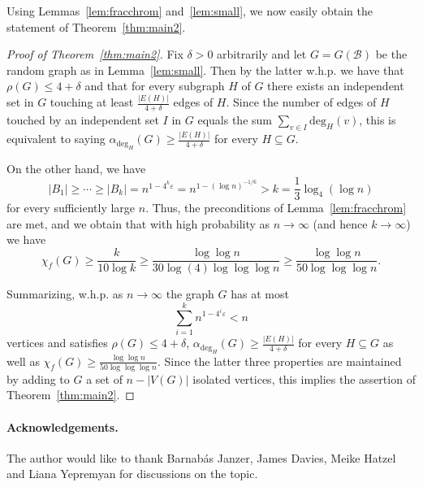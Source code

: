 \documentclass[a4paper,10pt]{amsart}
\begin{document}
Using Lemmas~\ref{lem:fracchrom} and~\ref{lem:small}, we now easily obtain the statement of Theorem~\ref{thm:main2}.

\begin{proof}[Proof of Theorem~\ref{thm:main2}]
Fix $\delta>0$ arbitrarily and let $G=G(\mathcal{B})$ be the random graph as in Lemma~\ref{lem:small}. Then by the latter w.h.p. we have that $\rho(G)\le 4+\delta$ and that for every subgraph $H$ of $G$ there exists an independent set in  $G$ touching at least $\frac{|E(H)|}{4+\delta}$ edges of $H$. Since the number of edges of $H$ touched by an independent set $I$ in $G$ equals the sum $\sum_{v\in I}\mathrm{deg}_H(v)$, this is equivalent to saying $\alpha_{\text{deg}_H}(G)\ge \frac{|E(H)|}{4+\delta}$ for every $H\subseteq G$. 

On the other hand, we have 
$$|B_1|\ge \cdots \ge |B_k|=n^{1-4^k\varepsilon}=n^{1-(\log n)^{-1/6}}>k=\frac{1}{3}\log_4(\log n)$$ for every sufficiently large $n$. Thus, the preconditions of Lemma~\ref{lem:fracchrom} are met, and we obtain that with high probability as $n\rightarrow\infty$ (and hence $k\rightarrow \infty$) we have $$\chi_f(G)\ge \frac{k}{10\log k}\ge \frac{\log \log n}{30\log(4) \log \log \log n}\ge \frac{\log \log n}{50\log \log\log n}.$$

Summarizing, w.h.p. as $n\rightarrow \infty$ the graph $G$ has at most
$$\sum_{i=1}^{k}n^{1-4^i\varepsilon}<n$$ vertices and satisfies $\rho(G)\le 4+\delta$, $\alpha_{\text{deg}_H}(G)\ge \frac{|E(H)|}{4+\delta}$ for every $H\subseteq G$ as well as $\chi_f(G)\ge \frac{\log \log n}{50\log \log \log n}$. Since the latter three properties are maintained by adding to $G$ a set of $n-|V(G)|$ isolated vertices, this implies the assertion of Theorem~\ref{thm:main2}. 
\end{proof}

\paragraph*{\textbf{Acknowledgements.}} The author would like to thank Barnab\'{a}s Janzer, James Davies, Meike Hatzel and Liana Yepremyan for discussions on the topic.


\end{document}
